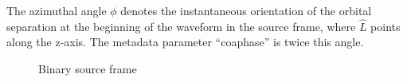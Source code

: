 \documentclass[aps,prd,amssymb,amsmath,amsfonts,superscriptaddress,
floatfix ,preprintnumbers,altaffilletter]{revtex4}
\begin{document}
The azimuthal angle $\phi$ denotes the instantaneous orientation of the orbital separation at the beginning of the waveform in the source frame, where $\hat{L}$ points along the z-axis. The metadata parameter ``coa\textunderscore phase'' is twice this angle.

\begin{figure}[!h]
\begin{center}
\def\svgwidth{0.4\columnwidth}

\caption{Binary source frame}
\label{fig:source}
\end{center}
\end{figure}




\end{document}
